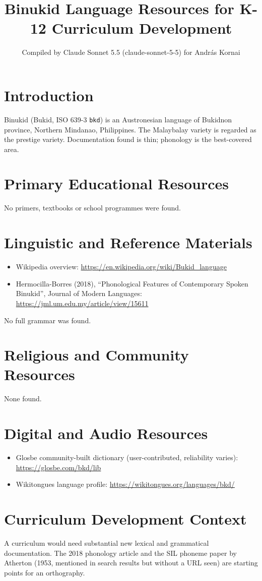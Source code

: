 \documentclass[12pt]{article}
\title{Binukid Language Resources for K-12 Curriculum Development}
\author{Compiled by Claude Sonnet 5.5 (claude-sonnet-5-5) for Andr\'as Kornai}
\date{}
\begin{document}
\maketitle

\section{Introduction}
Binukid (Bukid, ISO 639-3 \texttt{bkd}) is an Austronesian language of Bukidnon province, Northern Mindanao, Philippines. The Malaybalay variety is regarded as the prestige variety. Documentation found is thin; phonology is the best-covered area.

\section{Primary Educational Resources}
No primers, textbooks or school programmes were found.

\section{Linguistic and Reference Materials}
\begin{itemize}
\item Wikipedia overview: \url{https://en.wikipedia.org/wiki/Bukid_language}
\item Hermocilla-Borres (2018), ``Phonological Features of Contemporary Spoken Binukid'', Journal of Modern Languages: \url{https://jml.um.edu.my/article/view/15611}
\end{itemize}
No full grammar was found.

\section{Religious and Community Resources}
None found.

\section{Digital and Audio Resources}
\begin{itemize}
\item Glosbe community-built dictionary (user-contributed, reliability varies): \url{https://glosbe.com/bkd/lib}
\item Wikitongues language profile: \url{https://wikitongues.org/languages/bkd/}
\end{itemize}

\section{Curriculum Development Context}
A curriculum would need substantial new lexical and grammatical documentation. The 2018 phonology article and the SIL phoneme paper by Atherton (1953, mentioned in search results but without a URL seen) are starting points for an orthography.
\end{document}
